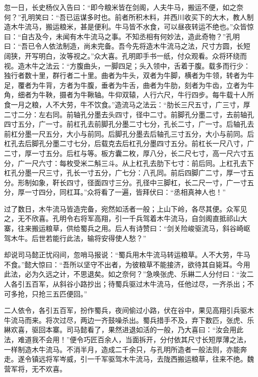 忽一日，长史杨仪入告曰：“即今粮米皆在剑阁，人夫牛马，搬运不便，如之奈何？”孔明笑曰：“吾已运谋多时也。前者所积木料，并西川收买下的大木，教人制造木牛流马，搬运粮米，甚是便利。牛马皆不水食，可以昼夜转运不绝也。”众皆惊曰：“自古及今，未闻有木牛流马之事。不知丞相有何妙法，造此奇物？”孔明曰：“吾已令人依法制造，尚未完备。吾今先将造木牛流马之法，尺寸方圆，长短阔狭，开写明白，汝等视之。”众大喜。孔明即手书一纸，付众观看。众将环绕而视。造木牛之法云：“方腹曲头，一脚四足；头入领中，舌着于腹。载多而行少：独行者数十里，群行者二十里。曲者为牛头，双者为牛脚，横者为牛领，转者为牛足，覆者为牛背，方者为牛腹，垂者为牛舌，曲者为牛肋，刻者为牛齿，立者为牛角，细者为牛鞅，摄者为牛鞦轴。牛仰双辕，人行六尺，牛行四步。每牛载十人所食一月之粮，人不大劳，牛不饮食。”造流马之法云：“肋长三尺五寸，广三寸，厚二寸二分：左右同。前轴孔分墨去头四寸，径中二寸。前脚孔分墨二寸，去前轴孔四寸五分，广一寸。前杠孔去前脚孔分墨二寸七分，孔长二寸，广一寸。后轴孔去前杠分墨一尺五分，大小与前同。后脚孔分墨去后轴孔三寸五分，大小与前同。后杠孔去后脚孔分墨二寸七分，后载克去后杠孔分墨四寸五分。前杠长一尺八寸，广二寸，厚一寸五分。后杠与等。板方囊二枚，厚八分，长二尺七寸，高一尺六寸五分，广一尺六寸：每枚受米二斛三斗。从上杠孔去肋下七寸：前后同。上杠孔去下杠孔分墨一尺三寸，孔长一寸五分，广七分：八孔同。前后四脚广二寸，厚一寸五分。形制如象，靬长四寸，径面四寸三分。孔径中三脚杠，长二尺一寸，广一寸五分，厚一寸四分，同杠耳。”众将看了一遍，皆拜伏曰：“丞相真神人也！”

过了数日，木牛流马皆造完备，宛然如活者一般；上山下岭，各尽其便。众军见之，无不欣喜。孔明令右将军高翔，引一千兵驾着木牛流马，自剑阁直抵祁山大寨，往来搬运粮草，供给蜀兵之用。后人有诗赞曰：“剑关险峻驱流马，斜谷崎岖驾木牛。后世若能行此法，输将安得使人愁？”

却说司马懿正忧闷间，忽哨马报说：“蜀兵用木牛流马转运粮草。人不大劳，牛马不食。”懿大惊曰：“吾所以坚守不出者，为彼粮草不能接济，欲待其自毙耳。今用此法，必为久远之计，不思退矣。如之奈何？”急唤张虎、乐綝二人分付曰：“汝二人各引五百军，从斜谷小路抄出；待蜀兵驱过木牛流马，任他过尽，一齐杀出；不可多抢，只抢三五匹便回。”

二人依令，各引五百军，扮作蜀兵，夜间偷过小路，伏在谷中，果见高翔引兵驱木牛流马而来。将次过尽，两边一齐鼓噪杀出。蜀兵措手不及，弃下数匹，张虎、乐綝欢喜，驱回本寨。司马懿看了，果然进退如活的一般，乃大喜曰：“汝会用此法，难道我不会用！”便令巧匠百余人，当面拆开，分付依其尺寸长短厚薄之法，一样制造木牛流马。不消半月，造成二千余只，与孔明所造者一般法则，亦能奔走。遂令镇远将军岑威，引一千军驱驾木牛流马，去陇西搬运粮草，往来不绝。魏营军将，无不欢喜。

